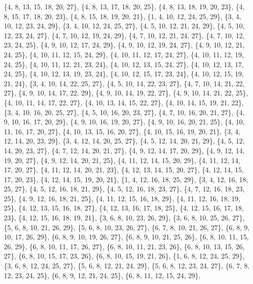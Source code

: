 \documentclass[11pt,a4paper]{article}
\begin{document}
{\{4, 8, 13, 15, 18, 20, 27\}, \{4, 8, 13, 17, 18, 20, 25\}, \{4, 8, 13, 18, 19, 20, 23\}, \{4, 8, 15, 17, 18, 20, 23\}, \{4, 8, 15, 18, 19, 20, 21\},
\{1, 4, 10, 12, 24, 25, 29\}, \{3, 4, 10, 12, 23, 24, 29\}, \{3, 4, 10, 12, 24, 25, 27\}, \{4, 5, 10, 12, 21, 24, 29\}, \{4, 5, 10, 12, 23, 24, 27\},
\{4, 7, 10, 12, 19, 24, 29\}, \{4, 7, 10, 12, 21, 24, 27\}, \{4, 7, 10, 12, 23, 24, 25\}, \{4, 9, 10, 12, 17, 24, 29\}, \{4, 9, 10, 12, 19, 24, 27\},
\{4, 9, 10, 12, 21, 24, 25\}, \{4, 10, 11, 12, 15, 24, 29\}, \{4, 10, 11, 12, 17, 24, 27\}, \{4, 10, 11, 12, 19, 24, 25\}, \{4, 10, 11, 12, 21, 23, 24\},
\{4, 10, 12, 13, 15, 24, 27\}, \{4, 10, 12, 13, 17, 24, 25\}, \{4, 10, 12, 13, 19, 23, 24\}, \{4, 10, 12, 15, 17, 23, 24\}, \{4, 10, 12, 15, 19, 21, 24\},
\{3, 4, 10, 14, 22, 25, 27\}, \{4, 5, 10, 14, 22, 23, 27\}, \{4, 7, 10, 14, 21, 22, 27\}, \{4, 9, 10, 14, 17, 22, 29\}, \{4, 9, 10, 14, 19, 22, 27\},
\{4, 9, 10, 14, 21, 22, 25\}, \{4, 10, 11, 14, 17, 22, 27\}, \{4, 10, 13, 14, 15, 22, 27\}, \{4, 10, 14, 15, 19, 21, 22\}, \{3, 4, 10, 16, 20, 25, 27\},
\{4, 5, 10, 16, 20, 23, 27\}, \{4, 7, 10, 16, 20, 21, 27\}, \{4, 9, 10, 16, 17, 20, 29\}, \{4, 9, 10, 16, 19, 20, 27\}, \{4, 9, 10, 16, 20, 21, 25\},
\{4, 10, 11, 16, 17, 20, 27\}, \{4, 10, 13, 15, 16, 20, 27\}, \{4, 10, 15, 16, 19, 20, 21\}, \{3, 4, 12, 14, 20, 23, 29\}, \{3, 4, 12, 14, 20, 25, 27\},
\{4, 5, 12, 14, 20, 21, 29\}, \{4, 5, 12, 14, 20, 23, 27\}, \{4, 7, 12, 14, 20, 21, 27\}, \{4, 9, 12, 14, 17, 20, 29\}, \{4, 9, 12, 14, 19, 20, 27\},
\{4, 9, 12, 14, 20, 21, 25\}, \{4, 11, 12, 14, 15, 20, 29\}, \{4, 11, 12, 14, 17, 20, 27\}, \{4, 11, 12, 14, 20, 21, 23\}, \{4, 12, 13, 14, 15, 20, 27\},
\{4, 12, 14, 15, 17, 20, 23\}, \{4, 12, 14, 15, 19, 20, 21\}, \{1, 4, 12, 16, 18, 25, 29\}, \{3, 4, 12, 16, 18, 25, 27\}, \{4, 5, 12, 16, 18, 21, 29\},
\{4, 5, 12, 16, 18, 23, 27\}, \{4, 7, 12, 16, 18, 23, 25\}, \{4, 9, 12, 16, 18, 21, 25\}, \{4, 11, 12, 15, 16, 18, 29\}, \{4, 11, 12, 16, 18, 19, 25\},
\{4, 12, 13, 15, 16, 18, 27\}, \{4, 12, 13, 16, 17, 18, 25\}, \{4, 12, 15, 16, 17, 18, 23\}, \{4, 12, 15, 16, 18, 19, 21\}, \{3, 6, 8, 10, 23, 26, 29\},
\{3, 6, 8, 10, 25, 26, 27\}, \{5, 6, 8, 10, 21, 26, 29\}, \{5, 6, 8, 10, 23, 26, 27\}, \{6, 7, 8, 10, 21, 26, 27\}, \{6, 8, 9, 10, 17, 26, 29\},
\{6, 8, 9, 10, 19, 26, 27\}, \{6, 8, 9, 10, 21, 25, 26\}, \{6, 8, 10, 11, 15, 26, 29\}, \{6, 8, 10, 11, 17, 26, 27\}, \{6, 8, 10, 11, 21, 23, 26\},
\{6, 8, 10, 13, 15, 26, 27\}, \{6, 8, 10, 15, 17, 23, 26\}, \{6, 8, 10, 15, 19, 21, 26\}, \{1, 6, 8, 12, 24, 25, 29\}, \{3, 6, 8, 12, 24, 25, 27\},
\{5, 6, 8, 12, 21, 24, 29\}, \{5, 6, 8, 12, 23, 24, 27\}, \{6, 7, 8, 12, 23, 24, 25\}, \{6, 8, 9, 12, 21, 24, 25\}, \{6, 8, 11, 12, 15, 24, 29\},
}
\end{document}
